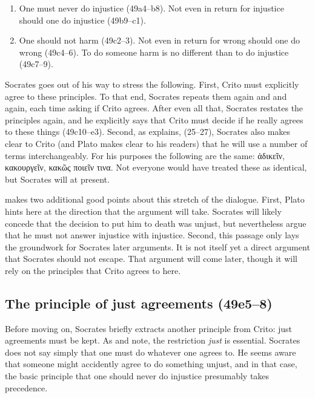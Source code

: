 \documentclass[11pt]{article}
\begin{document}
\begin{enumerate}

    \item One must never do injustice (49a4--b8).  Not even in return for
        injustice should one do injustice (49b9--c1).

    \item One should not harm (49c2--3).  Not even in return for wrong
        should one do wrong (49c4--6).  To do someone harm is no different
        than to do injustice (49c7--9).

\end{enumerate}

Socrates goes out of his way to stress the following.  First, Crito must
explicitly agree to these principles.  To that end, Socrates repeats them
again and and again, each time asking if Crito agrees.  After even all
that, Socrates restates the principles again, and he explicitly says that
Crito must decide if he really agrees to these things (49c10--e3).  Second,
as \citet{kraut1984} explains, (25--27), Socrates also makes clear to Crito
(and Plato makes clear to his readers) that he will use a number of terms
interchangeably.  For his purposes the following are the same: {\g
ἀδικεῖν}, {\g κακουργεῖν}, {\g κακῶς ποιεῖν τινα}.  Not everyone would have
treated these as identical, but Socrates will at present.

\citet{kraut1984} makes two additional good points about this stretch of
the dialogue.  First, Plato hints here at the direction that the argument
will take. Socrates will likely concede that the decision to put him to
death was unjust, but nevertheless argue that he must not answer injustice
with injustice.  Second, this passage only lays the groundwork for Socrates
later arguments.  It is not itself yet a direct argument that Socrates
should not escape.  That argument will come later, though it will rely on
the principles that Crito agrees to here.


\subsection{The principle of just agreements (49e5--8)}

Before moving on, Socrates briefly extracts another principle from Crito:
just agreements must be kept.  As \citet{kraut1984} and
\citet{brickhouse2004} note, the restriction \emph{just} is essential.
Socrates does not say simply that one must do whatever one agrees to.  He
seems aware that someone might accidently agree to do something unjust, and
in that case, the basic principle that one should never do injustice
presumably takes precedence.
\end{document}
